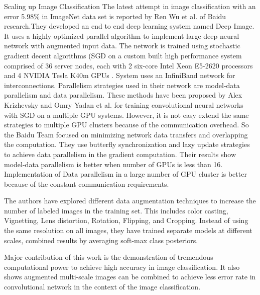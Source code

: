 \documentclass{article}
\begin{document}
\begin{subsection}{Scaling up Image Classification}
The latest attempt in image classification with an error 5.98\% in ImageNet data set is reported by  Ren Wu et al. \cite{Wu2015} of Baidu research.They developed an end to end deep learning  system named Deep Image. It uses a highly optimized parallel algorithm  to implement large deep neural network with augmented input data. The network is trained using stochastic gradient decent algorithms (SGD on a custom built high performance system comprised of 36 server nodes, each with 2 six-core Intel Xeon E5-2620 processors and 4 NVIDIA Tesla K40m GPUs . System  uses an InfiniBand  network for interconnections. Parallelism strategies used in their network are model-data parallelism and data parallelism.  These methods have been proposed by Alex Krizhevsky \cite{Krizhevsky2014} and Omry Yadan et al. \cite{Yadan2013} for training convolutional neural networks with SGD on a  multiple GPU systems. However, it is not easy extend the same strategies to multiple GPU clusters because of the communication overhead. So the  Baidu Team focused on minimizing network data transfers and overlapping the computation. They use butterfly synchronization and lazy update strategies to achieve data parallelism in the gradient computation. Their results show model-data parallelism is better when number of GPUs is less than 16. Implementation of Data parallelism in a large number  of GPU  cluster is better because of the constant communication requirements.
\par
The authors have explored different data augmentation techniques to increase the number of labeled images in the training set. This includes color casting, Vignetting, Lens distortion, Rotation, Flipping, and  Cropping. Instead of using the same resolution on all images, they have trained separate models at different scales, combined results by averaging soft-max class posteriors.

\par
 Major contribution of this work is the demonstration of tremendous computational power to achieve high accuracy in image classification.
It also shows augmented multi-scale images can be combined to achieve less error rate in convolutional network in the context of the image classification. 
 \end{subsection}
\end{document}
